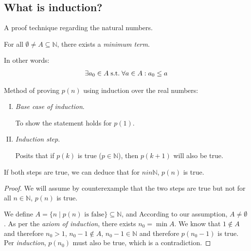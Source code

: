 \documentclass[00_complete]{subfiles}
\begin{document}
\subsection{What is induction?}
A proof technique regarding the natural numbers.

\begin{axiom}
    For all $\emptyset \neq A \subseteq \mathbb{N}$, there exists a \emph{minimum
    term}.

    In other words:
    $$\exists a_0 \in A \;\mathrm{s.t.}\; \forall a \in A: a_0 \leq a$$
\end{axiom}

Method of proving $p(n)$ using induction over the real numbers:
\begin{enumerate}[I.]
    \item \emph{Base case of induction}.

    To show the statement holds for $p(1)$.
    \item \emph{Induction step}.

    Posits that if $p(k)$ is true ($p \in \mathbb{N}$), then $p(k+1)$ will also
    be true.
\end{enumerate}
If both steps are true, we can deduce that for $n in \mathbb{N}$, $p(n)$ is true.
\begin{proof}
    We will assume by counterexample that the two steps are true but not for
    all $n \in \mathbb{N}$, $p(n)$ is true.

    We define $A =\{n \mid p(n) \text{ is false}\} \subseteq \mathbb{N}$, and
    According to our assumption, $A \neq \emptyset$. As per the \emph{axiom of
    induction}, there exists $n_0 = \min{A}$. We know that $1 \notin A$ and
    therefore $n_0>1$, $n_0-1 \notin A$, $n_0-1 \in \mathbb{N}$ and therefore
    $p(n_0-1)$ is true. Per \emph{induction}, $p(n_0)$ must also be true, which
    is a contradiction.
\end{proof}
\end{document}
